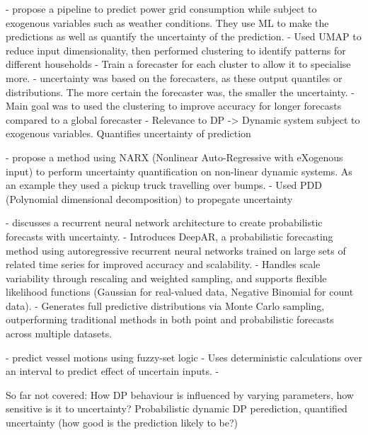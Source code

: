 - \cite{tsiakalosScalableProbabilisticLoad2026a} propose a pipeline to predict power grid consumption while subject to exogenous variables such as weather conditions. They use ML to make the predictions as well as quantify the uncertainty of the prediction. 
    -   Used UMAP to reduce input dimensionality, then performed clustering to identify patterns for different households
    - Train a forecaster for each cluster to allow it to specialise more.
    - uncertainty was based on the forecasters, as these output quantiles or distributions. The more certain the forecaster was, the smaller the uncertainty.
    - Main goal was to used the clustering to improve accuracy for longer forecasts compared to a global forecaster
    - Relevance to DP -> Dynamic system subject to exogenous variables. Quantifies uncertainty of prediction

- \cite{ebadollahiTimedependentUncertaintyQuantification2025} propose a method using NARX (Nonlinear Auto-Regressive with eXogenous input) to perform uncertainty quantification on non-linear dynamic systems. As an example they used a pickup truck travelling over bumps.
    - Used PDD (Polynomial dimensional decomposition) to propegate uncertainty

- \cite{salinasDeepARProbabilisticForecasting2020} discusses a recurrent neural network architecture to create probabilistic forecasts with uncertainty.
    - Introduces DeepAR, a probabilistic forecasting method using autoregressive recurrent neural networks trained on large sets of related time series for improved accuracy and scalability.
    - Handles scale variability through rescaling and weighted sampling, and supports flexible likelihood functions (Gaussian for real-valued data, Negative Binomial for count data).
    - Generates full predictive distributions via Monte Carlo sampling, outperforming traditional methods in both point and probabilistic forecasts across multiple datasets. 

- \cite{yogeeshIntervalBasedMultiBodyDynamics2025} predict vessel motions using fuzzy-set logic
    - Uses deterministic calculations over an interval to predict effect of uncertain inputs.
    - 

So far not covered:
How DP behaviour is influenced by varying parameters, how sensitive is it to uncertainty?
Probabilistic dynamic DP perediction, quantified uncertainty (how good is the prediction likely to be?)
